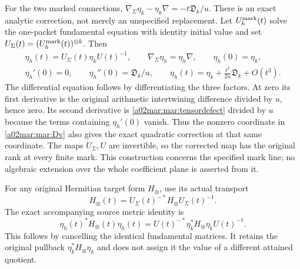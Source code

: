 \documentclass[11pt,a4paper]{article}
\begin{document}
For the two marked connections,
$\nabla_\Sigma\eta_k-\eta_k\nabla=-t\mathfrak D_k/u$.
There is an exact analytic correction, not merely an unspecified
replacement. Let $U_h^{\rm mark}(t)$ solve the one-packet
fundamental equation with identity initial value and set
$U_\Sigma(t)=(U_h^{\rm mark}(t))^{\otimes k}$.
Then
\begin{equation}\tag{MAR25}\label{a02mar:mar:eta-horizontal}
 \begin{gathered}
 \eta_h(t)=U_\Sigma(t)\eta_k U(t)^{-1},\qquad
 \nabla_\Sigma\eta_h=\eta_h\nabla,\qquad\eta_h(0)=\eta_k,\\
 \eta_h'(0)=0,\qquad\eta_h''(0)=\mathfrak D_k/u,
 \qquad\eta_h(t)=\eta_k+\frac{t^2}{2u}\mathfrak D_k+O(t^3).
 \end{gathered}
\end{equation}
The differential equation follows by differentiating the three
factors. At zero its first derivative is the original arithmetic
intertwining difference divided by $u$, hence zero. Its second
derivative is \eqref{a02mar:mar:tensordefect} divided by $u$ because
the terms containing $\eta_h'(0)$ vanish. Thus the nonzero
coordinate in \eqref{a02mar:mar:Dv} also gives the exact quadratic
correction at that same coordinate. The maps $U_\Sigma,U$ are
invertible, so the corrected map has the original rank at every
finite mark. This construction concerns the specified mark line;
no algebraic extension over the whole coefficient plane is
asserted from it.

For any original Hermitian target form $H_\otimes$, use its actual
transport \[H_\otimes(t)=U_\Sigma(t)^{-*}H_\otimes U_\Sigma(t)^{-1}.\]
The exact accompanying source metric identity is
\begin{equation}\tag{MAR26}\label{a02mar:mar:tensormetric}
 \eta_h(t)^*H_\otimes(t)\eta_h(t)
    =U(t)^{-*}\eta_k^*H_\otimes\eta_k U(t)^{-1}.
\end{equation}
This follows by cancelling the identical fundamental matrices.
It retains the original pullback $\eta_k^*H_\otimes\eta_k$ and
does not assign it the value of a different attained quotient.
\end{document}
